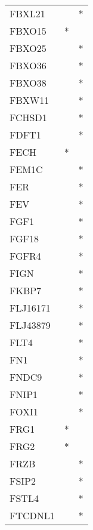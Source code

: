 \begin{longtable}{lcc}
FBXL21          &                &          * \\
FBXO15          &              * &            \\
FBXO25          &                &          * \\
FBXO36          &                &          * \\
FBXO38          &                &          * \\
FBXW11          &                &          * \\
FCHSD1          &                &          * \\
FDFT1           &                &          * \\
FECH            &              * &            \\
FEM1C           &                &          * \\
FER             &                &          * \\
FEV             &                &          * \\
FGF1            &                &          * \\
FGF18           &                &          * \\
FGFR4           &                &          * \\
FIGN            &                &          * \\
FKBP7           &                &          * \\
FLJ16171        &                &          * \\
FLJ43879        &                &          * \\
FLT4            &                &          * \\
FN1             &                &          * \\
FNDC9           &                &          * \\
FNIP1           &                &          * \\
FOXI1           &                &          * \\
FRG1            &              * &            \\
FRG2            &              * &            \\
FRZB            &                &          * \\
FSIP2           &                &          * \\
FSTL4           &                &          * \\
FTCDNL1         &                &          * \\

\end{longtable}
